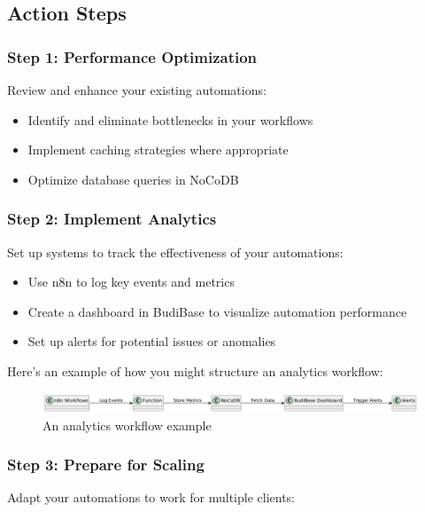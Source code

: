 \subsection{Action Steps}

\subsubsection{Step 1: Performance Optimization}
Review and enhance your existing automations:

\begin{itemize}
    \item Identify and eliminate bottlenecks in your workflows
    \item Implement caching strategies where appropriate
    \item Optimize database queries in NoCoDB
\end{itemize}

\subsubsection{Step 2: Implement Analytics}
Set up systems to track the effectiveness of your automations:

\begin{itemize}
    \item Use n8n to log key events and metrics
    \item Create a dashboard in BudiBase to visualize automation performance
    \item Set up alerts for potential issues or anomalies
\end{itemize}

Here's an example of how you might structure an analytics workflow:


\begin{figure}
    \centering
    \includegraphics{figures/09-analytics-workflow}
    \caption{An analytics workflow example}
    \label{fig:analytics-workflow-example}
\end{figure}

\subsubsection{Step 3: Prepare for Scaling}
Adapt your automations to work for multiple clients:

